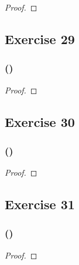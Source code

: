 \documentclass[14pt]{extarticle}
\begin{document}
\begin{proof}

\end{proof}

\subsection{Exercise 29}

\subsubsection{()}

\begin{proof}

\end{proof}

\subsection{Exercise 30}

\subsubsection{()}

\begin{proof}

\end{proof}

\subsection{Exercise 31}

\subsubsection{()}

\begin{proof}

\end{proof}
\end{document}
